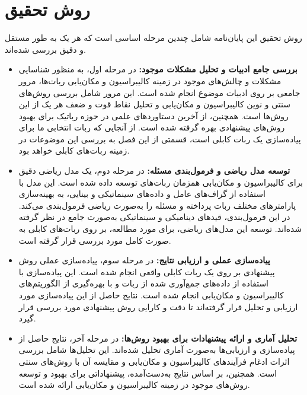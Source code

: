 \section{روش تحقیق}
روش تحقیق این پایان‌نامه شامل چندین مرحله اساسی است که هر یک به طور مستقل و دقیق بررسی شده‌اند.
\begin{itemize}


\item \textbf{بررسی جامع ادبیات و تحلیل مشکلات موجود:}
در مرحله اول، به منظور شناسایی مشکلات و چالش‌های موجود در زمینه کالیبراسیون و مکان‌یابی ربات‌ها، مرور جامعی بر روی ادبیات موضوع انجام شده است. این مرور شامل بررسی روش‌های سنتی و نوین کالیبراسیون و مکان‌یابی و تحلیل نقاط قوت و ضعف هر یک از این روش‌ها است. همچنین، از آخرین دستاوردهای علمی در حوزه رباتیک برای بهبود روش‌های پیشنهادی بهره گرفته شده است. از آنجایی که ربات انتخابی ما برای پیاده‌سازی یک ربات کابلی است، قسمتی از این فصل به بررسی این موضوعات در زمینه ربات‌های کابلی خواهد بود.


\item \textbf{توسعه مدل ریاضی و فرمول‌بندی مسئله:}
در مرحله دوم، یک مدل ریاضی دقیق برای کالیبراسیون و مکان‌یابی همزمان ربات‌های توسعه داده شده است. این مدل با استفاده از گراف‌های عامل و داده‌های سینماتیکی و بینایی، به بهینه‌سازی پارامترهای مختلف ربات پرداخته و مسئله را به‌صورت ریاضی فرمول‌بندی می‌کند. در این فرمول‌بندی، قیدهای دینامیکی و سینماتیکی به‌صورت جامع در نظر گرفته شده‌اند. توسعه این مدل‌های ریاضی، برای مورد مطالعه، بر روی ربات‌های کابلی به صورت کامل مورد بررسی قرار گرفته است. 

\item \textbf{پیاده‌سازی عملی و ارزیابی نتایج:}
در مرحله سوم، پیاده‌سازی عملی روش پیشنهادی بر روی یک ربات کابلی واقعی انجام شده است. این پیاده‌سازی با استفاده از داده‌های جمع‌آوری شده از ربات و با بهره‌گیری از الگوریتم‌های کالیبراسیون و مکان‌یابی انجام شده است. نتایج حاصل از این پیاده‌سازی مورد ارزیابی و تحلیل قرار گرفته‌اند تا دقت و کارایی روش پیشنهادی مورد بررسی قرار گیرد.

\item \textbf{تحلیل آماری و ارائه پیشنهادات برای بهبود روش‌ها:}
در مرحله آخر، نتایج حاصل از پیاده‌سازی و ارزیابی‌ها به‌صورت آماری تحلیل شده‌اند. این تحلیل‌ها شامل بررسی اثرات ادغام فرآیندهای کالیبراسیون و مکان‌یابی و مقایسه آن با روش‌های سنتی است. همچنین، بر اساس نتایج به‌دست‌آمده، پیشنهاداتی برای بهبود و توسعه روش‌های موجود در زمینه کالیبراسیون و مکان‌یابی ارائه شده است.

\end{itemize}

